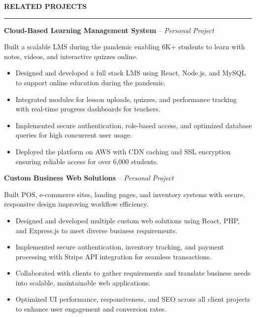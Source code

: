 \documentclass[10pt,letterpaper]{article}
\begin{document}
\vspace{6pt}

\textbf{RELATED PROJECTS}\\[-8pt]
\noindent\rule{\textwidth}{1pt}

\vspace{-2pt}

\textbf{Cloud-Based Learning Management System} -- \emph{Personal Project}

\vspace{-1pt}

Built a scalable LMS during the pandemic enabling 6K+ students to learn with notes, videos, and interactive quizzes online.
\vspace{-1pt}
\begin{itemize}
\item Designed and developed a full stack LMS using React, Node.js, and MySQL to support online education during the pandemic.
\item Integrated modules for lesson uploads, quizzes, and performance tracking with real-time progress dashboards for teachers.
\item Implemented secure authentication, role-based access, and optimized database queries for high concurrent user usage.
\item Deployed the platform on AWS with CDN caching and SSL encryption ensuring reliable access for over 6,000 students.
\end{itemize}

\textbf{Custom Business Web Solutions} -- \emph{Personal Project}

\vspace{-1pt}

Built POS, e-commerce sites, landing pages, and inventory systems with secure, responsive design improving workflow efficiency.
\vspace{-1pt}
\begin{itemize}
\item Designed and developed multiple custom web solutions using React, PHP, and Express.js to meet diverse business requirements.
\item Implemented secure authentication, inventory tracking, and payment processing with Stripe API integration for seamless transactions.
\item Collaborated with clients to gather requirements and translate business needs into scalable, maintainable web applications.
\item Optimized UI performance, responsiveness, and SEO across all client projects to enhance user engagement and conversion rates.
\end{itemize}
\end{document}
